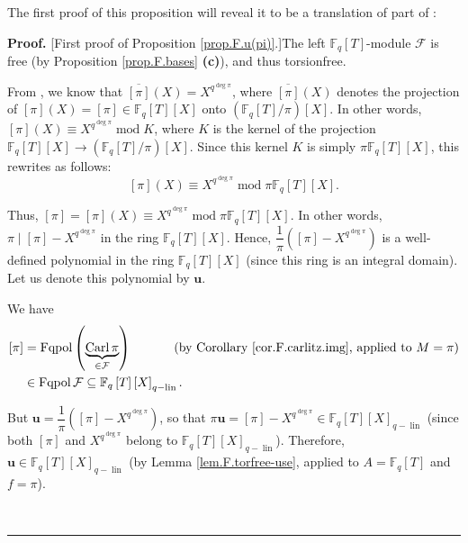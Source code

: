 \documentclass[numbers=enddot,12pt,final,onecolumn,notitlepage]{scrartcl}%
\theoremstyle{definition}
\newenvironment{proof}[1][Proof]{\noindent\textbf{#1.} }{\ \rule{0.5em}{0.5em}}
\begin{document}
The first proof of this proposition will reveal it to be a translation of part
of \cite[Theorem 2.11]{kc-carlitz}:

\begin{proof}
[First proof of Proposition \ref{prop.F.u(pi)}.]The left $\mathbb{F}%
_{q}\left[  T\right]  $-module $\mathcal{F}$ is free (by Proposition
\ref{prop.F.bases} \textbf{(c)}), and thus torsionfree.

From \cite[Theorem 2.11]{kc-carlitz}, we know that $\overline{\left[
\pi\right]  }\left(  X\right)  =X^{q^{\deg\pi}}$, where $\overline{\left[
\pi\right]  }\left(  X\right)  $ denotes the projection of $\left[
\pi\right]  \left(  X\right)  =\left[  \pi\right]  \in\mathbb{F}_{q}\left[
T\right]  \left[  X\right]  $ onto $\left(  \mathbb{F}_{q}\left[  T\right]
/\pi\right)  \left[  X\right]  $. In other words, $\left[  \pi\right]  \left(
X\right)  \equiv X^{q^{\deg\pi}}\operatorname{mod}K$, where $K$ is the kernel
of the projection $\mathbb{F}_{q}\left[  T\right]  \left[  X\right]
\rightarrow\left(  \mathbb{F}_{q}\left[  T\right]  /\pi\right)  \left[
X\right]  $. Since this kernel $K$ is simply $\pi\mathbb{F}_{q}\left[
T\right]  \left[  X\right]  $, this rewrites as follows:%
\[
\left[  \pi\right]  \left(  X\right)  \equiv X^{q^{\deg\pi}}\operatorname{mod}%
\pi\mathbb{F}_{q}\left[  T\right]  \left[  X\right]  .
\]


Thus, $\left[  \pi\right]  =\left[  \pi\right]  \left(  X\right)  \equiv
X^{q^{\deg\pi}}\operatorname{mod}\pi\mathbb{F}_{q}\left[  T\right]  \left[
X\right]  $. In other words, $\pi\mid\left[  \pi\right]  -X^{q^{\deg\pi}}$ in
the ring $\mathbb{F}_{q}\left[  T\right]  \left[  X\right]  $. Hence,
$\dfrac{1}{\pi}\left(  \left[  \pi\right]  -X^{q^{\deg\pi}}\right)  $ is a
well-defined polynomial in the ring $\mathbb{F}_{q}\left[  T\right]  \left[
X\right]  $ (since this ring is an integral domain). Let us denote this
polynomial by $\mathbf{u}$.

We have%
\begin{align*}
\left[  \pi\right]   &  =\operatorname*{Fqpol}\left(
\underbrace{\operatorname*{Carl}\pi}_{\in\mathcal{F}}\right)
\ \ \ \ \ \ \ \ \ \ \left(  \text{by Corollary \ref{cor.F.carlitz.img},
applied to }M=\pi\right) \\
&  \in\operatorname*{Fqpol}\mathcal{F}\subseteq\mathbb{F}_{q}\left[  T\right]
\left[  X\right]  _{q-\operatorname*{lin}}.
\end{align*}


But $\mathbf{u}=\dfrac{1}{\pi}\left(  \left[  \pi\right]  -X^{q^{\deg\pi}%
}\right)  $, so that $\pi\mathbf{u}=\left[  \pi\right]  -X^{q^{\deg\pi}}%
\in\mathbb{F}_{q}\left[  T\right]  \left[  X\right]  _{q-\operatorname*{lin}}$
(since both $\left[  \pi\right]  $ and $X^{q^{\deg\pi}}$ belong to
$\mathbb{F}_{q}\left[  T\right]  \left[  X\right]  _{q-\operatorname*{lin}}$).
Therefore, $\mathbf{u}\in\mathbb{F}_{q}\left[  T\right]  \left[  X\right]
_{q-\operatorname*{lin}}$ (by Lemma \ref{lem.F.torfree-use}, applied to
$A=\mathbb{F}_{q}\left[  T\right]  $ and $f=\pi$).


\end{proof}
\end{document}
